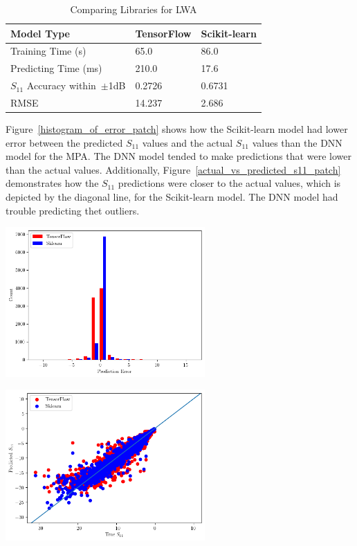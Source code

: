 \documentclass[conference]{IEEEtran}
\newenvironment{Figure}
    {\par\medskip\noindent\minipage{\linewidth}}
    {\endminipage\par\medskip}
\begin{document}
\begin{table}[h]
\caption{Comparing Libraries for LWA}
\begin{center}
\begin{tabular}{ |l|l|l| }
    \hline
    Model Type & TensorFlow & Scikit-learn \\ 
    \hline
    Training Time (s) & 65.0 & 86.0 \\  
    \hline
    Predicting Time (ms) & 210.0 & 17.6 \\
    \hline
    $S_{11}$ Accuracy within~$\pm$1dB & 0.2726 & 0.6731 \\
    \hline
    RMSE & 14.237 & 2.686 \\
    \hline
\end{tabular}
\end{center}
\label{comparing_libraries_lw}
\end{table}

Figure~\ref{histogram_of_error_patch} shows how the Scikit-learn model had lower error between the predicted $S_{11}$ values and the actual $S_{11}$ values than the DNN model for the MPA. The DNN model tended to make predictions that were lower than the actual values. Additionally, Figure~\ref{actual_vs_predicted_s11_patch} demonstrates how the $S_{11}$ predictions were closer to the actual values, which is depicted by the diagonal line, for the Scikit-learn model. The DNN model had trouble predicting thet outliers. 

\begin{Figure}
    \centering
    \includegraphics[width=3in]{histogram_patch}
    \label{histogram_of_error_patch}
\end{Figure}

\begin{Figure}
    \centering
    \includegraphics[width=3in]{actual_vs_predicted_s11_patch}
    \label{actual_vs_predicted_s11_patch}
\end{Figure}
\end{document}
